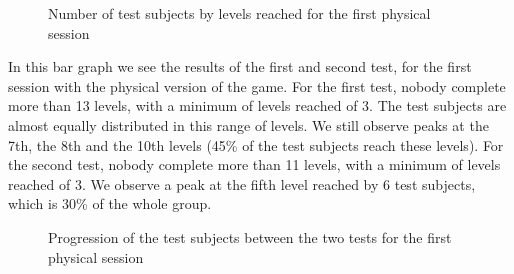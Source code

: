 \documentclass[12pt, openany, twocolumn]{article}
\begin{document}
                \begin{figure}[H]
                    \setlength{\fboxsep}{0pt}
                    \setlength{\fboxrule}{1pt}
                    \caption{Number of test subjects by levels reached for the first physical session}
                \end{figure}
            In this bar graph we see the results of the first and second test, for the first session with the physical version of the game.
            For the first test, nobody complete more than 13 levels, with a minimum of levels reached of 3.
            The test subjects are almost equally distributed in this range of levels.  
            We still observe peaks at the 7th, the 8th and the 10th levels (45\% of the test subjects reach these levels).
            For the second test, nobody complete more than 11 levels, with a minimum of levels reached of 3. 
            We observe a peak at the fifth level reached by 6 test subjects, which is 30\% of the whole group.
            \\
        
                \begin{figure}[H]
                    \setlength{\fboxsep}{0pt}
                    \setlength{\fboxrule}{1pt}
                    \caption{Progression of the test subjects between the two tests for the first physical session}
                \end{figure}
\end{document}
